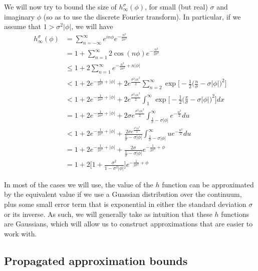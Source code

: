 \documentclass[../thesis-main/thesis-main]{subfiles}
\begin{document}
We will now try to bound the size of $h_\infty^\sigma(\phi)$, for small (but real) $\sigma$ and imaginary $\phi$ (so as to use the discrete Fourier transform).  In particular, if we assume that $1 > \sigma^2 |\phi|$, we will have
\begin{align}
  h_\infty^\sigma(\phi) &= \sum_{n=-\infty}^\infty e^{i n \phi} e^{- \frac{n^2}{2\sigma^2}}\\
    &= 1 + \sum_{n=1}^\infty 2 \cos(n \phi) e^{-\frac{n^2}{2\sigma^2}}\\
    &\leq 1 + 2 \sum_{n=1}^\infty e^{ -\frac{n^2}{2\sigma^2} + n |\phi|}\\
    &< 1 + 2 e^{- \frac{1}{2\sigma^2} + |\phi|} + 2 e^{ \frac{\sigma^2|\phi|^2 }{2}}\sum_{n=2}^\infty \exp\Big[ -\frac{1}{2}\Big(\frac{n}{\sigma} - \sigma |\phi|\Big)^2 \Big]\\
    &< 1 + 2 e^{ - \frac{1}{2\sigma^2} + |\phi|} + 2 e^{ \frac{\sigma^2|\phi|^2 }{2}}\int_{1}^\infty  \exp\Big[ -\frac{1}{2}\Big(\frac{x}{\sigma} - \sigma |\phi|\Big)^2 \Big]dx\\
    &= 1 + 2 e^{-\frac{1}{2\sigma^2} + |\phi|} + 2 \sigma e^{ \frac{\sigma^2|\phi|^2 }{2}} \int_{\frac{1}{\sigma} - \sigma|\phi|}^\infty e^{-\frac{u^2}{2}} du\\
    &< 1 + 2 e^{-\frac{1}{2\sigma^2} + |\phi|} + \frac{2 \sigma e^{\frac{\sigma^2|\phi|^2}{2}}}{\frac{1}{\sigma} - \sigma |\phi|} \int_{\frac{1}{\sigma} - \sigma|\phi|}^\infty u e^{-\frac{u^2}{2}} du\\
    &= 1 + 2 e^{-\frac{1}{2\sigma^2} + |\phi|} + \frac{2 \sigma}{\frac{1}{\sigma} - \sigma |\phi|} e^{-\frac{1}{2\sigma^2} + \phi}\\
    &= 1 + 2 \Bigg[ 1 + \frac{\sigma^2}{1 - \sigma^2|\phi|}\Bigg]e^{-\frac{1}{2\sigma^2} + \phi} \label{eq:h_bound}
\end{align}

In most of the cases we will use, the value of the $h$ function can be approximated by the equivalent value if we use a Guassian distribution over the continuum, plus some small error term that is exponential in either the standard deviation $\sigma$ or its inverse.  As such, we will generally take as intuition that these $h$ functions are Gaussians, which will allow us to construct approximations that are easier to work with.


\subsection{Propagated approximation bounds}
\end{document}
